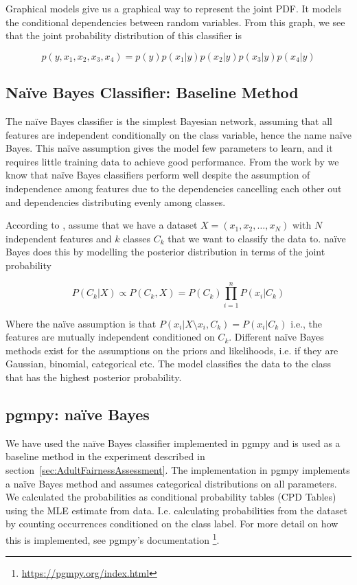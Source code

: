 Graphical models give us a graphical way to represent the joint PDF. It models the conditional dependencies between random variables. From this graph, we see that the joint probability distribution of this classifier is

\begin{equation*}
    p(y, x_1, x_2, x_3, x_4) = p(y)p(x_1|y)p(x_2|y)p(x_3|y)p(x_4|y)
\end{equation*}

\subsection{Naïve Bayes Classifier: Baseline Method}
\label{relatedwork:naiveBayes}
The naïve Bayes classifier is the simplest Bayesian network, assuming that all features are independent conditionally on the class variable, hence the name naïve Bayes. This naïve assumption gives the model few parameters to learn, and it requires little training data to achieve good performance. From the work by \citet{Zhang:2004:AAAI} we know that naïve Bayes classifiers perform well despite the assumption of independence among features due to the dependencies cancelling each other out and dependencies distributing evenly among classes.

According to \citet[p.~217]{Ankan:2015:Book}, assume that we have a dataset $X = (x_1, x_2, \dots, x_N)$ with $N$ independent features and $k$ classes $C_k$ that we want to classify the data to. naïve Bayes does this by modelling the posterior distribution in terms of the joint probability

$$
P(C_k | X) \propto P(C_k , X) = P(C_k) \prod_{i=1}^{n} P(x_i|C_k)
$$

Where the naïve assumption is that $P(x_i | X \setminus x_i , C_k) = P(x_i | C_k)$ i.e., the features are mutually independent conditioned on $C_k$. Different naïve Bayes methods exist for the assumptions on the priors and likelihoods, i.e. if they are Gaussian, binomial, categorical etc. The model classifies the data to the class that has the highest posterior probability. 

\subsection{pgmpy: naïve Bayes}

We have used the naïve Bayes classifier implemented in pgmpy and is used as a baseline method in the experiment described in section~\ref{sec:AdultFairnessAssessment}. The implementation in pgmpy implements a naïve Bayes method and assumes categorical distributions on all parameters. We calculated the probabilities as conditional probability tables (CPD Tables) using the MLE estimate from data. I.e. calculating probabilities from the dataset by counting occurrences conditioned on the class label. For more detail on how this is implemented, see pgmpy's documentation \footnote{\url{https://pgmpy.org/index.html}}.

